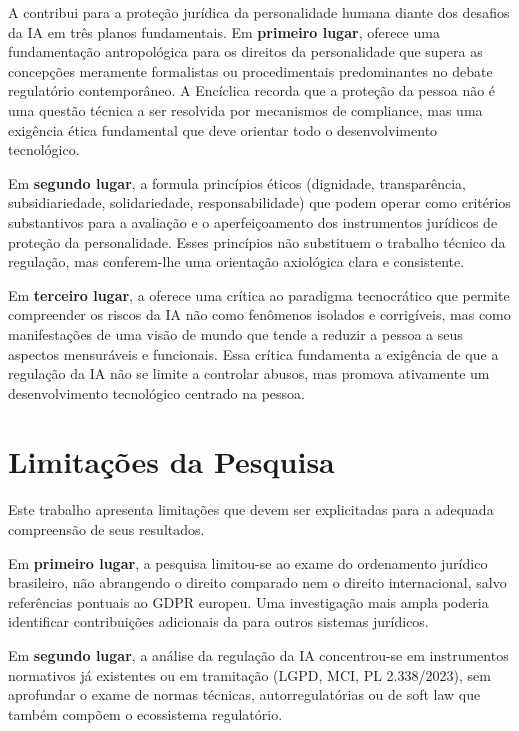 A \MH{} contribui para a proteção jurídica da personalidade humana diante dos desafios da IA em três planos fundamentais. Em \textbf{primeiro lugar}, oferece uma fundamentação antropológica para os direitos da personalidade que supera as concepções meramente formalistas ou procedimentais predominantes no debate regulatório contemporâneo. A Encíclica recorda que a proteção da pessoa não é uma questão técnica a ser resolvida por mecanismos de compliance, mas uma exigência ética fundamental que deve orientar todo o desenvolvimento tecnológico.

Em \textbf{segundo lugar}, a \MH{} formula princípios éticos (dignidade, transparência, subsidiariedade, solidariedade, responsabilidade) que podem operar como critérios substantivos para a avaliação e o aperfeiçoamento dos instrumentos jurídicos de proteção da personalidade. Esses princípios não substituem o trabalho técnico da regulação, mas conferem-lhe uma orientação axiológica clara e consistente.

Em \textbf{terceiro lugar}, a \MH{} oferece uma crítica ao paradigma tecnocrático que permite compreender os riscos da IA não como fenômenos isolados e corrigíveis, mas como manifestações de uma visão de mundo que tende a reduzir a pessoa a seus aspectos mensuráveis e funcionais. Essa crítica fundamenta a exigência de que a regulação da IA não se limite a controlar abusos, mas promova ativamente um desenvolvimento tecnológico centrado na pessoa.

\section{Limitações da Pesquisa}
\label{sec:limitacoes}

Este trabalho apresenta limitações que devem ser explicitadas para a adequada compreensão de seus resultados.

Em \textbf{primeiro lugar}, a pesquisa limitou-se ao exame do ordenamento jurídico brasileiro, não abrangendo o direito comparado nem o direito internacional, salvo referências pontuais ao GDPR europeu. Uma investigação mais ampla poderia identificar contribuições adicionais da \MH{} para outros sistemas jurídicos.

Em \textbf{segundo lugar}, a análise da regulação da IA concentrou-se em instrumentos normativos já existentes ou em tramitação (LGPD, MCI, PL 2.338/2023), sem aprofundar o exame de normas técnicas, autorregulatórias ou de soft law que também compõem o ecossistema regulatório.

